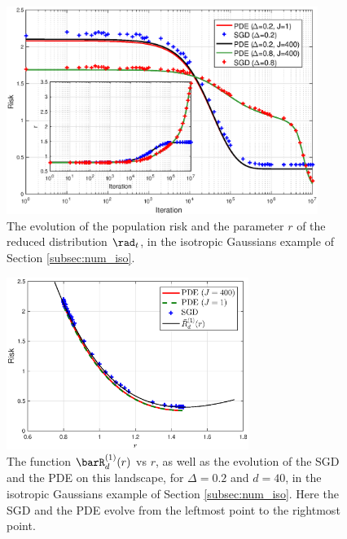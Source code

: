 \documentclass[11pt]{article}
\begin{document}
\begin{figure}[]
	\begin{center}
		\includegraphics[width=0.9\textwidth]{isoPDE_flatSigmoid_J400_d320_n800_step10_J1.eps}
	\end{center}
	\caption{The evolution of the population risk and the parameter $r$ of the reduced distribution $\rad_t$, in the isotropic Gaussians example of Section \ref{subsec:num_iso}.}
	\label{fig:num_iso_risk}
\end{figure}

\begin{figure}[]
	\begin{center}
		\includegraphics[width=0.7\textwidth]{isotropic_flatSigmoid_PDE_riskSingle_Delta2.eps}
	\end{center}
	\caption{The function $\barR_d^{(1)}(r)$ vs $r$, as well as the evolution of the SGD and the PDE on this landscape, for $\Delta=0.2$ and $d=40$, in the isotropic Gaussians example of Section \ref{subsec:num_iso}. Here the SGD and the PDE evolve from the leftmost point to the rightmost point.}
	\label{fig:num_iso_riskSingleDelta_Delta2}
\end{figure}
\end{document}
